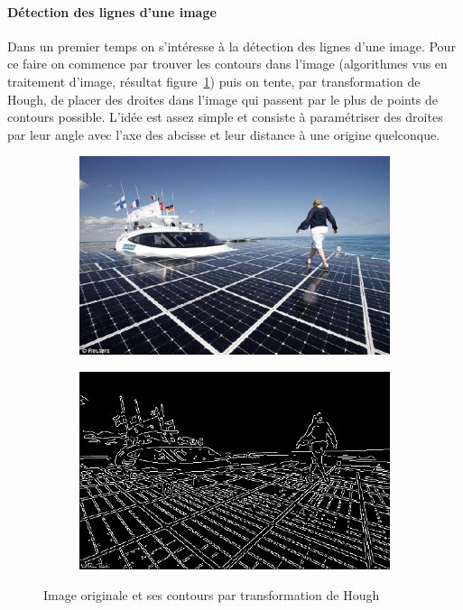 \documentclass{article}
\begin{document}
\paragraph{Détection des lignes d'une image}
Dans un premier temps on s'intéresse à la détection des lignes d'une image. Pour ce faire on commence par trouver les contours dans l'image (algorithmes vus en traitement d'image, résultat figure~\ref{5-contours}) puis on tente, par transformation de Hough, de placer des droites dans l'image qui passent par le plus de points de contours possible. L'idée est assez simple et consiste à paramétriser des droites par leur angle avec l'axe des abcisse et leur distance à une origine quelconque.
\begin{figure}[!ht]
    \centering
    \begin{subfigure}[c]{0.49\linewidth}
        \centering
        \includegraphics[width=\linewidth]{images/5-original.png}
    \end{subfigure}
    \hfill
    \begin{subfigure}[c]{0.49\linewidth}
        \centering
        \includegraphics[width=\linewidth]{images/5-contours.png}
    \end{subfigure}
    \caption{Image originale et ses contours par transformation de Hough}
    \label{5-contours}
\end{figure}
\end{document}
